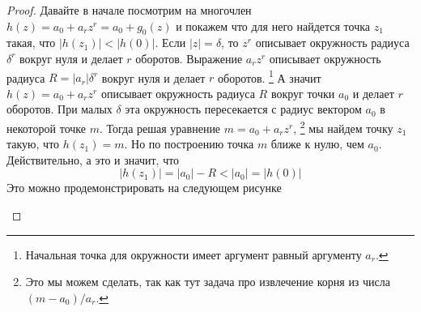 \begin{proof}
Давайте в начале посмотрим на многочлен $h(z) = a_0 + a_r z^r = a_0 + g_0(z)$ и покажем что для  него найдется точка $z_1$ такая, что $|h(z_1)| < |h(0)|$.
Если $|z| = \delta$, то $z^r$ описывает окружность радиуса $\delta^r$ вокруг нуля и делает $r$ оборотов.
Выражение $a_r z^r$ описывает окружность радиуса $R = |a_r|\delta^r$ вокруг нуля и делает $r$ оборотов.%
\footnote{Начальная точка для окружности имеет аргумент равный аргументу $a_r$.}
А значит $h(z) = a_0 + a_r z^r$ описывает окружность радиуса $R$ вокруг точки $a_0$ и делает $r$ оборотов.
При малых $\delta$ эта окружность пересекается с радиус вектором $a_0$ в некоторой точке $m$.
Тогда решая уравнение $m = a_0 + a_r z^r$,%
\footnote{Это мы можем сделать, так как тут задача про извлечение корня из числа $(m - a_0) / a_r$.}
мы найдем точку $z_1$ такую, что $h(z_1) = m$.
Но по построению точка $m$ ближе к нулю, чем $a_0$.
Действительно, а это и значит, что 
\[
|h(z_1)| = |a_0| - R < |a_0| = |h(0)|
\]
Это можно продемонстрировать на следующем рисунке
\begin{center}
\end{center}
\end{proof}
